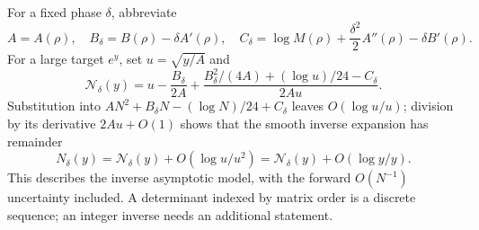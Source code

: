 \documentclass[11pt,a4paper]{article}
\numberwithin{equation}{section}
\theoremstyle{remark}\newtheorem{remark}[theorem]{Remark}
\begin{document}
For a fixed phase $\delta$, abbreviate
\begin{equation}\label{psh:eq:phaseconstants}
 A=A(\rho),\quad B_\delta=B(\rho)-\delta A'(\rho),\quad
 C_\delta=\log M(\rho)+\frac{\delta^2}{2}A''(\rho)-\delta B'(\rho).
\end{equation}
For a large target $e^y$, set $u=\sqrt{y/A}$ and
\begin{equation}\label{psh:eq:inverse}
 \mathcal N_\delta(y)=u-\frac{B_\delta}{2A}
  +\frac{B_\delta^2/(4A)+(\log u)/24-C_\delta}{2Au}.
\end{equation}
Substitution into $AN^2+B_\delta N-(\log N)/24+C_\delta$ leaves
$O(\log u/u)$; division by its derivative $2Au+O(1)$ shows that the
smooth inverse expansion has remainder
\begin{equation}\label{psh:eq:inverseerror}
 N_\delta(y)=\mathcal N_\delta(y)+O(\log u/u^2)
            =\mathcal N_\delta(y)+O(\log y/y).
\end{equation}
This describes the inverse asymptotic model, with the forward
$O(N^{-1})$ uncertainty included. A determinant indexed by matrix order
is a discrete sequence; an integer inverse needs an additional statement.
\end{document}
